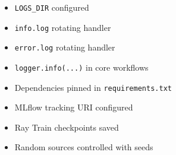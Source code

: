 \documentclass[11pt,a4paper]{article}
\begin{document}
\begin{figure}[H]
\begin{tcolorbox}
        \begin{minipage}[t]{0.30\textwidth}
            \begin{tcolorbox}[
                enhanced,
                height=5.6cm,
                colback=white,
                colframe=blue,
                coltitle=blue,
                fonttitle=\bfseries,
                title=Logging,
                arc=2mm,
                boxrule=0.8pt,
                left=3mm,
                right=3mm,
                top=2mm,
                bottom=2mm
            ]
                \small\raggedright
                \begin{itemize}[leftmargin=1em,itemsep=0.35em]
                    \item \texttt{LOGS\_DIR} configured
                    \item \texttt{info.log} rotating handler
                    \item \texttt{error.log} rotating handler
                    \item \texttt{logger.info(...)} in core workflows
                \end{itemize}
            \end{tcolorbox}
        \end{minipage}
        \hfill
        \begin{minipage}[t]{0.30\textwidth}
            \begin{tcolorbox}[
                enhanced,
                height=5.6cm,
                colback=white,
                colframe=teal,
                coltitle=teal,
                fonttitle=\bfseries,
                title=Reproducibility,
                arc=2mm,
                boxrule=0.8pt,
                left=3mm,
                right=3mm,
                top=2mm,
                bottom=2mm
            ]
                \small\raggedright
                \begin{itemize}[leftmargin=1em,itemsep=0.35em]
                    \item Dependencies pinned in \texttt{requirements.txt}
                    \item MLflow tracking URI configured
                    \item Ray Train checkpoints saved
                    \item Random sources controlled with seeds
                \end{itemize}
            \end{tcolorbox}
        \end{minipage}

\end{tcolorbox}
\end{figure}
\end{document}
